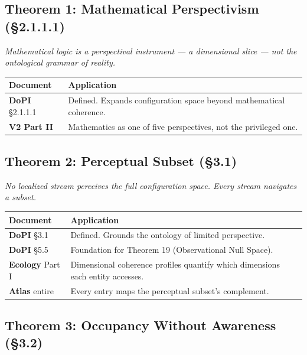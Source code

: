 \subsection*{Theorem 1: Mathematical Perspectivism (§2.1.1.1)}


\textit{Mathematical logic is a perspectival instrument — a dimensional slice — not the ontological grammar of reality.}



\begin{longtable}{p{} p{}}
\toprule
\textbf{Document} & \textbf{Application} \\
\midrule
\endhead
\textbf{DoPI} §2.1.1.1 & Defined. Expands configuration space beyond mathematical coherence. \\
\textbf{V2 Part II} & Mathematics as one of five perspectives, not the privileged one. \\
\bottomrule
\end{longtable}



\subsection*{Theorem 2: Perceptual Subset (§3.1)}


\textit{No localized stream perceives the full configuration space. Every stream navigates a subset.}



\begin{longtable}{p{} p{}}
\toprule
\textbf{Document} & \textbf{Application} \\
\midrule
\endhead
\textbf{DoPI} §3.1 & Defined. Grounds the ontology of limited perspective. \\
\textbf{DoPI} §5.5 & Foundation for Theorem 19 (Observational Null Space). \\
\textbf{Ecology} Part I & Dimensional coherence profiles quantify which dimensions each entity accesses. \\
\textbf{Atlas} entire & Every entry maps the perceptual subset's complement. \\
\bottomrule
\end{longtable}



\subsection*{Theorem 3: Occupancy Without Awareness (§3.2)}


